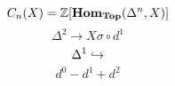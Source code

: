 \documentclass[12pt]{amsproc}
\begin{document}



$$ C_n(X) = \mathbb{Z}[\mathbf{Hom}_{\mathbf{Top}}(\Delta^n, X)] $$
$$ \Delta^2 \to X \sigma \circ d^1$$
$$ \Delta^1 \hookrightarrow $$
$$ d^0 - d^1 + d^2 $$
\end{document}
